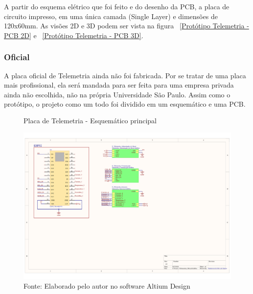 \documentclass[../poliXuniversity_hospital_-USP-report.tex]{subfiles}
\begin{document}
A partir do esquema elétrico que foi feito e do desenho da PCB, a placa de circuito impresso, em uma única camada (Single Layer) e dimensões de 120x60mm. As visões 2D e 3D podem ser vista na figura ~\ref{Protótipo Telemetria - PCB 2D} e ~\ref{Protótipo Telemetria - PCB 3D}.

\clearpage

\subsubsection{Oficial}

A placa oficial de Telemetria ainda não foi fabricada. Por se tratar de uma placa mais profissional, ela será mandada para ser feita para uma empresa privada ainda não escolhida, não na própria Universidade São Paulo. Assim como o protótipo, o projeto como um todo foi dividido em um esquemático e uma PCB.

\begin{figure}[!h]
\centering
    \caption{Placa de Telemetria - Esquemático principal }
    \centering %
    \includegraphics[width=17cm]{modulos/Telemetria_Oficial-1.png}
    \caption*{Fonte: Elaborado pelo autor no software Altium Design\cite{altium21} }
    \label{Protótipo placa de ## - Esquemático principal}
\end{figure}
\end{document}
